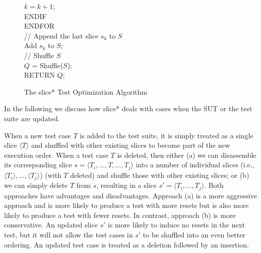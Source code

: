 \documentclass[authoryear,preprint,12pt]{elsarticle}
\begin{document}
\begin{figure}
{{\begin{minipage}{1.01\linewidth}
\hspace*{0.5cm}   $k=k+1$;\\
\hspace*{0.3cm} ENDIF\\
\hspace*{0.1cm}ENDFOR\\
\hspace*{0.1cm}// Append the last slice $s_k$ to $S$\\
\hspace*{0.1cm}Add $s_k$ to $S$;\\
\hspace*{0.1cm}// Shuffle $S$\\
\hspace*{0.1cm}$Q$ = Shuffle($S$);\\
\hspace*{0.1cm}RETURN $Q$;
\end{minipage}
}
}
\caption{The {\sc slice*} Test Optimization Algorithm}
\label{algorithm}
\end{figure}   
   
In the following we discuss how {\sc slice*} deals with cases when the SUT or the test suite are updated.

When a new test case $T$ is added to the test suite, it is simply treated as a single slice $\langle T \rangle$ 
and shuffled with other existing slices to become part of the new execution order.
When a test case $T$ is deleted, then either (a) we can disassemble its corresponding slice $s=\langle T_i, \dots, T, \dots, T_j \rangle$
into a number of individual slices (i.e., $\langle T_i \rangle , \dots, \langle T_j \rangle$) (with $T$ deleted)
and shuffle those with other existing slices;
or (b) we can simply delete $T$ from $s$, resulting in a slice $s'=\langle T_i, \dots, T_j \rangle$.
Both approaches have advantages and disadvantages.
Approach (a) is a more aggressive approach and is more likely to produce a test with more resets but is also 
more likely to produce a test with fewer resets.
In contrast, approach (b) is more conservative.
An updated slice $s'$ is more likely to induce no resets in the next test,
but it will not allow the test cases in $s'$ to be shuffled into an even better ordering.
An updated test case is treated as a deletion followed by an insertion.
\end{document}
